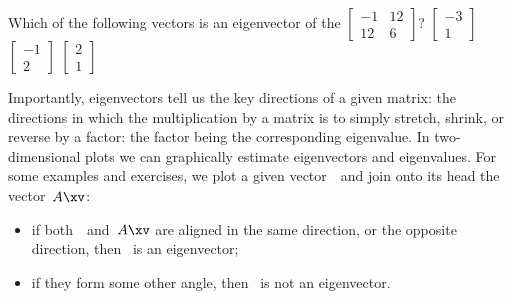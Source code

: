 \begin{activity}
Which of the following vectors is an eigenvector of the  \(\begin{bmatrix} -1&12\\12&6 \end{bmatrix}\)?
{\(\begin{bmatrix} -3\\1 \end{bmatrix}\)}
{\(\begin{bmatrix} -1\\2 \end{bmatrix}\)}
{\(\begin{bmatrix} 2\\1 \end{bmatrix}\)}
\end{activity}



Importantly, eigenvectors tell us the key directions of a given matrix: the directions in which the multiplication by a matrix is to simply stretch, shrink, or reverse by a factor: the factor being the corresponding eigenvalue.
In two-dimensional plots we can graphically estimate eigenvectors and eigenvalues.
For some examples and exercises, we plot a given vector~\xv\ and join onto its head the vector~\(A\xv\): 
\begin{itemize}
\item if both~\xv\ and~\(A\xv\) are aligned in the same direction, or the opposite direction, then \xv~is an eigenvector; 
\item if they form some other angle, then \xv~is not an eigenvector.
\end{itemize}
  

